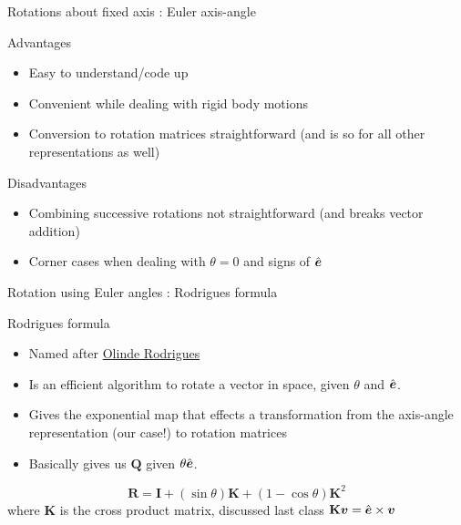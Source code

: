 \documentclass[presentation]{beamer}
\newcommand{\gv}[1]{\ensuremath{\mbox{\boldmath$ #1 $}}}
\newcommand{\bv}[1]{\ensuremath{\mathbf{#1}}}
\begin{document}
\begin{frame}[label={sec:org77d1bd2}]{Rotations about fixed axis : Euler axis-angle}
\begin{block}{Advantages}
\begin{itemize}
\item Easy to understand/code up
\item Convenient while dealing with rigid body motions
\item Conversion to rotation matrices straightforward (and is so for all other
representations as well)
\end{itemize}
\end{block}
\begin{block}{Disadvantages}
\begin{itemize}
\item Combining successive rotations not straightforward (and breaks vector addition)
\item Corner cases when dealing with \(\theta = 0\) and signs of \(\hat{\gv{e}}\)
\end{itemize}
\end{block}
\end{frame}
\begin{frame}[label={sec:orged5a943}]{Rotation using Euler angles : Rodrigues formula}
\begin{block}{Rodrigues formula}
\begin{itemize}
\item Named after \href{https://en.wikipedia.org/wiki/Olinde\_Rodrigues}{Olinde Rodrigues}
\item Is an efficient algorithm to rotate a vector in space, given \(\theta\)
and \(\hat{\gv{e}}\).
\item Gives the exponential map that effects a transformation from the
axis-angle representation (our case!) to rotation matrices
\item Basically gives us \(\bv{Q}\) given \(\theta \hat{\gv{e}}\).
\end{itemize}
\[ \mathbf {R} =\mathbf {I} +(\sin \theta )\mathbf {K} +(1-\cos \theta )\mathbf {K} ^{2} \]
where \(\mathbf{K}\) is the cross product matrix, discussed last class \(\mathbf{K}\gv{v} = \hat{\gv{e}} \times \gv{v}\)
\end{block}
\end{frame}
\end{document}

